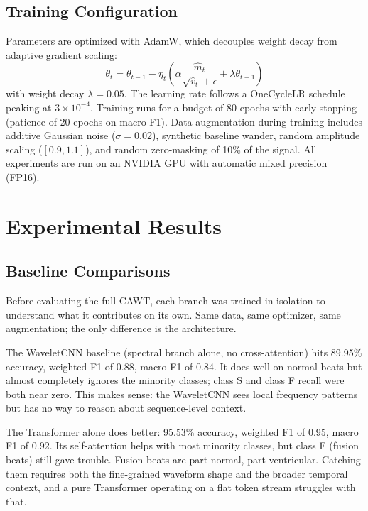 \documentclass[conference]{IEEEtran}
\begin{document}
\subsection{Training Configuration}
Parameters are optimized with AdamW, which decouples weight decay from adaptive gradient scaling:
\begin{equation}
    \theta_{t} = \theta_{t-1} - \eta_t \left( \alpha \frac{\hat{m}_t}{\sqrt{\hat{v}_t} + \epsilon} + \lambda \theta_{t-1} \right)
\end{equation}
with weight decay $\lambda = 0.05$. The learning rate follows a OneCycleLR schedule peaking at $3 \times 10^{-4}$. Training runs for a budget of 80 epochs with early stopping (patience of 20 epochs on macro F1). Data augmentation during training includes additive Gaussian noise ($\sigma = 0.02$), synthetic baseline wander, random amplitude scaling ($[0.9, 1.1]$), and random zero-masking of 10\% of the signal. All experiments are run on an NVIDIA GPU with automatic mixed precision (FP16).
 
\section{Experimental Results}
 
\subsection{Baseline Comparisons}
Before evaluating the full CAWT, each branch was trained in isolation to understand what it contributes on its own. Same data, same optimizer, same augmentation; the only difference is the architecture.
 
The WaveletCNN baseline (spectral branch alone, no cross-attention) hits 89.95\% accuracy, weighted F1 of 0.88, macro F1 of 0.84. It does well on normal beats but almost completely ignores the minority classes; class S and class F recall were both near zero. This makes sense: the WaveletCNN sees local frequency patterns but has no way to reason about sequence-level context.
 
The Transformer alone does better: 95.53\% accuracy, weighted F1 of 0.95, macro F1 of 0.92. Its self-attention helps with most minority classes, but class F (fusion beats) still gave trouble. Fusion beats are part-normal, part-ventricular. Catching them requires both the fine-grained waveform shape and the broader temporal context, and a pure Transformer operating on a flat token stream struggles with that.
\end{document}
